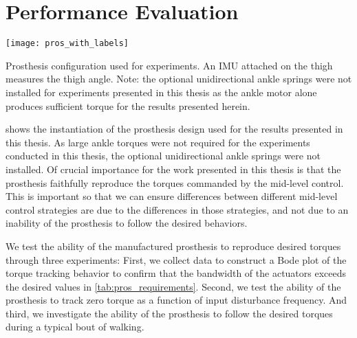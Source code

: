 \section{Performance Evaluation}\label{sec:pros_perf_eval}

\begin{marginfigure}[-1in]
\centerline{\texttt{[image: pros\_with\_labels]}}
\caption[Prosthesis configuration used for experiments]{Prosthesis configuration
used for experiments. An IMU attached on the thigh measures the thigh angle.
Note: the optional unidirectional ankle springs were not installed for
experiments presented in this thesis as the ankle motor alone produces
sufficient torque for the results presented
herein.}\label{fig:prosthesis_actual}
\end{marginfigure}

 shows the instantiation of the prosthesis design
used for the results presented in this thesis. As large ankle torques were not
required for the experiments conducted in this thesis, the optional
unidirectional ankle springs were not installed. Of crucial importance for the
work presented in this thesis is that the prosthesis faithfully reproduce the
torques commanded by the mid-level control. This is important so that we can
ensure differences between different mid-level control strategies are due to
the differences in those strategies, and not due to an inability of the
prosthesis to follow the desired behaviors.

We test the ability of the manufactured prosthesis to reproduce desired torques
through three experiments: First, we collect data to construct a Bode plot of
the torque tracking behavior to confirm that the bandwidth of the actuators
exceeds the desired values in \cref{tab:pros_requirements}.  Second, we test the
ability of the prosthesis to track zero torque as a function of input
disturbance frequency. And third, we investigate the ability of the prosthesis
to follow the desired torques during a typical bout of walking.

